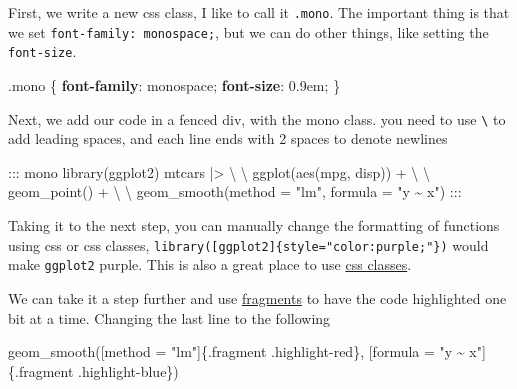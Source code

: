 \documentclass[
  letterpaper,
  DIV=11,
  numbers=noendperiod]{scrreprt}
\newenvironment{Shaded}{\begin{snugshade}}{\end{snugshade}}
\newcommand{\CommentTok}[1]{\textcolor[rgb]{0.37,0.37,0.37}{#1}}
\newcommand{\DataTypeTok}[1]{\textcolor[rgb]{0.68,0.00,0.00}{#1}}
\newcommand{\DecValTok}[1]{\textcolor[rgb]{0.68,0.00,0.00}{#1}}
\newcommand{\FunctionTok}[1]{\textcolor[rgb]{0.28,0.35,0.67}{#1}}
\newcommand{\KeywordTok}[1]{\textcolor[rgb]{0.00,0.23,0.31}{\textbf{#1}}}
\newcommand{\NormalTok}[1]{\textcolor[rgb]{0.00,0.23,0.31}{#1}}
\newcommand{\OperatorTok}[1]{\textcolor[rgb]{0.37,0.37,0.37}{#1}}
\newcommand{\OtherTok}[1]{\textcolor[rgb]{0.00,0.23,0.31}{#1}}
\begin{document}
First, we write a new css class, I like to call it \texttt{.mono}. The
important thing is that we set \texttt{font-family:\ monospace;}, but we
can do other things, like setting the \texttt{font-size}.

\begin{Shaded}
\begin{Highlighting}[]
\FunctionTok{.mono}\NormalTok{ \{}
  \KeywordTok{font{-}family}\NormalTok{: }\DecValTok{monospace}\OperatorTok{;}
  \KeywordTok{font{-}size}\NormalTok{: }\DecValTok{0.9}\DataTypeTok{em}\OperatorTok{;}
\NormalTok{\}}
\end{Highlighting}
\end{Shaded}

Next, we add our code in a fenced div, with the mono class. you need to
use \texttt{\textbackslash{}} to add leading spaces, and each line ends
with 2 spaces to denote newlines

\begin{Shaded}
\begin{Highlighting}[]
\NormalTok{::: mono}
\NormalTok{library(ggplot2)}
\NormalTok{mtcars |\textgreater{}  }
\NormalTok{\textbackslash{} \textbackslash{} ggplot(aes(mpg, disp)) +  }
\NormalTok{\textbackslash{} \textbackslash{} geom\_point() +  }
\NormalTok{\textbackslash{} \textbackslash{} geom\_smooth(method = "lm", formula = "y \textasciitilde{} x")}
\NormalTok{:::}
\end{Highlighting}
\end{Shaded}

Taking it to the next step, you can manually change the formatting of
functions using css or css classes,
\texttt{library({[}ggplot2{]}\{style="color:purple;"\})} would make
\texttt{ggplot2} purple. This is also a great place to use
\href{https://emilhvitfeldt.com/post/slidecraft-colors-fonts/\#using-css-classes}{css
classes}.

We can take it a step further and use
\href{https://quarto.org/docs/presentations/revealjs/advanced.html\#fragments}{fragments}
to have the code highlighted one bit at a time. Changing the last line
to the following

\begin{Shaded}
\begin{Highlighting}[]
\NormalTok{geom\_smooth(}\CommentTok{[}\OtherTok{method = "lm"}\CommentTok{]}\NormalTok{\{.fragment .highlight{-}red\}, }\CommentTok{[}\OtherTok{formula = "y \textasciitilde{} x"}\CommentTok{]}\NormalTok{\{.fragment .highlight{-}blue\})}
\end{Highlighting}
\end{Shaded}
\end{document}
